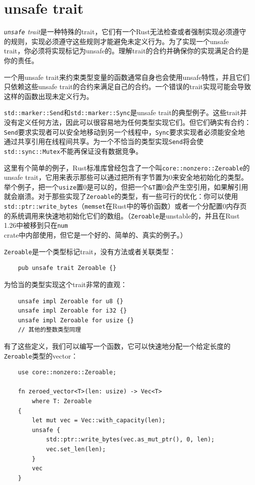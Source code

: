 \section{unsafe trait}\label{UnsafeTrait}
\emph{\texttt{unsafe} trait}是一种特殊的trait，它们有一个Rust无法检查或者强制实现必须遵守的规则，实现必须遵守这些规则才能避免未定义行为。为了实现一个unsafe trait，你必须将实现标记为unsafe的。理解trait的合约并确保你的实现满足合约是你的责任。

一个用unsafe trait来约束类型变量的函数通常自身也会使用unsafe特性，并且它们只依赖这些unsafe trait的合约来满足自己的合约。一个错误的trait实现可能会导致这样的函数出现未定义行为。

\texttt{std::marker::Send}和\texttt{std::marker::Sync}是unsafe trait的典型例子。这些trait并没有定义任何方法，因此可以很容易地为任何类型实现它们。但它们确实有合约：\texttt{Send}要求实现者可以安全地移动到另一个线程中，\texttt{Sync}要求实现者必须能安全地通过共享引用在线程间共享。为一个不恰当的类型实现\texttt{Send}将会使\texttt{std::sync::Mutex}不能再保证没有数据竞争。

这里有个简单的例子，Rust标准库曾经包含了一个叫\texttt{core::nonzero::Zeroable}的unsafe trait，它用来表示那些可以通过把所有字节置为0来安全地初始化的类型。举个例子，把一个\texttt{usize}置0是可以的，但把一个\texttt{\&T}置0会产生空引用，如果解引用就会崩溃。对于那些实现了\texttt{Zeroable}的类型，有一些可行的优化：你可以使用\texttt{std::ptr::write\_bytes}（\texttt{memset}在Rust中的等价函数）或者一个分配置0内存页的系统调用来快速地初始化它们的数组。（\texttt{Zeroable}是unstable的，并且在Rust 1.26中被移到只在\texttt{num} crate中内部使用，但它是一个好的、简单的、真实的例子。）

\texttt{Zeroable}是一个类型标记trait，没有方法或者关联类型：
\begin{verbatim}
    pub unsafe trait Zeroable {}
\end{verbatim}

为恰当的类型实现这个trait非常的直观：
\begin{verbatim}
    unsafe impl Zeroable for u8 {}
    unsafe impl Zeroable for i32 {}
    unsafe impl Zeroable for usize {}
    // 其他的整数类型同理
\end{verbatim}

有了这些定义，我们可以编写一个函数，它可以快速地分配一个给定长度的\texttt{Zeroable}类型的vector：
\begin{verbatim}
    use core::nonzero::Zeroable;

    fn zeroed_vector<T>(len: usize) -> Vec<T>
        where T: Zeroable
    {
        let mut vec = Vec::with_capacity(len);
        unsafe {
            std::ptr::write_bytes(vec.as_mut_ptr(), 0, len);
            vec.set_len(len);
        }
        vec
    }
\end{verbatim}

